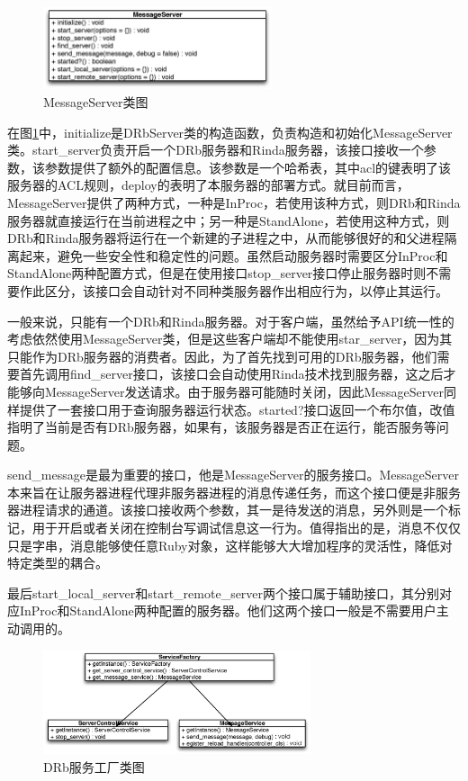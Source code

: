 \begin{figure}[h]
\centering
\includegraphics[width=0.6\textwidth]{images/detail/message_bus_class.eps}
\caption{MessageServer类图}
\label{fig-msg-server-class}
\end{figure}

在图\ref{fig-msg-server-class}中，initialize是DRbServer类的构造函数，负责构造和初始化MessageServer类。start\_server负责开启一个DRb服务器和Rinda服务器，该接口接收一个参数，该参数提供了额外的配置信息。该参数是一个哈希表，其中acl的键表明了该服务器的ACL规则，deploy的表明了本服务器的部署方式。就目前而言，MessageServer提供了两种方式，一种是InProc，若使用该种方式，则DRb和Rinda服务器就直接运行在当前进程之中；另一种是StandAlone，若使用这种方式，则DRb和Rinda服务器将运行在一个新建的子进程之中，从而能够很好的和父进程隔离起来，避免一些安全性和稳定性的问题。虽然启动服务器时需要区分InProc和StandAlone两种配置方式，但是在使用接口stop\_server接口停止服务器时则不需要作此区分，该接口会自动针对不同种类服务器作出相应行为，以停止其运行。

一般来说，只能有一个DRb和Rinda服务器。对于客户端，虽然给予API统一性的考虑依然使用MessageServer类，但是这些客户端却不能使用star\_server，因为其只能作为DRb服务器的消费者。因此，为了首先找到可用的DRb服务器，他们需要首先调用find\_server接口，该接口会自动使用Rinda技术找到服务器，这之后才能够向MessageServer发送请求。由于服务器可能随时关闭，因此MessageServer同样提供了一套接口用于查询服务器运行状态。started?接口返回一个布尔值，改值指明了当前是否有DRb服务器，如果有，该服务器是否正在运行，能否服务等问题。

send\_message是最为重要的接口，他是MessageServer的服务接口。MessageServer本来旨在让服务器进程代理非服务器进程的消息传递任务，而这个接口便是非服务器进程请求的通道。该接口接收两个参数，其一是待发送的消息，另外则是一个标记，用于开启或者关闭在控制台写调试信息这一行为。值得指出的是，消息不仅仅只是字串，消息能够使任意Ruby对象，这样能够大大增加程序的灵活性，降低对特定类型的耦合。

最后start\_local\_server和start\_remote\_server两个接口属于辅助接口，其分别对应InProc和StandAlone两种配置的服务器。他们这两个接口一般是不需要用户主动调用的。

\begin{figure}[h]
\centering
\includegraphics[width=0.7\textwidth]{images/detail/factory_class.eps}
\caption{DRb服务工厂类图}
\label{fig-factory-class}
\end{figure}

